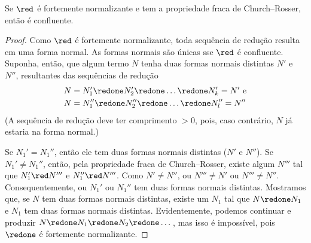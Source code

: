 \documentclass[../../../include/open-logic-section]{subfiles}
\begin{document}
\begin{lem}
Se $\red$ é fortemente normalizante e tem a propriedade fraca de
Church--Rosser, então é confluente.
\end{lem}

\begin{proof}
  Como $\red$ é fortemente normalizante, toda sequência de redução
  resulta em uma forma normal. As formas normais são únicas sse $\red$
  é confluente. Suponha, então, que algum termo $N$ tenha duas formas
  normais distintas $N'$ e $N''$, resultantes das sequências de redução
  \begin{align*}
  N & = N_1' \redone N_2' \redone \dots \redone N_k' = N' \text{ e}\\
  N & = N_1'' \redone N_2'' \redone \dots \redone N_l'' = N''
  \end{align*}
  (A sequência de redução deve ter comprimento $>0$, pois, caso
  contrário, $N$ já estaria na forma normal.)

  Se $N_1' = N_1''$, então ele tem duas formas normais distintas ($N'$ e
  $N''$). Se $N_1' \neq N_1''$, então, pela propriedade fraca de
  Church--Rosser, existe algum $N'''$ tal que $N_1' \red N'''$ e
  $N_1'' \red N'''$. Como $N' \neq N''$, ou $N''' \neq N'$ ou $N'''
  \neq N''$. Consequentemente, ou $N_1'$ ou $N_1''$ tem duas formas
  normais distintas. Mostramos que, se $N$ tem duas formas normais
  distintas, existe um $N_1$ tal que $N \redone N_1$ e $N_1$ tem duas
  formas normais distintas. Evidentemente, podemos continuar e produzir
  $N \redone N_1 \redone N_2 \redone \dots$, mas isso é impossível,
  pois $\redone$ é fortemente normalizante.
\end{proof}
\end{document}
